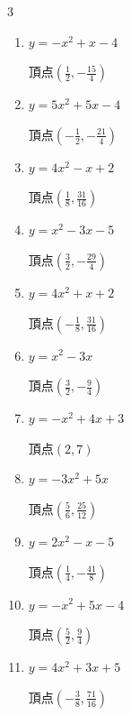 \begin{multicols}{3}
\begin{enumerate}
\resetques

  \item $\displaystyle y=-x^{2}+x-4$

        $\displaystyle 頂点\left( \frac{1}{2} , -\frac{15}{4} \right)$

  \item $\displaystyle y=5x^{2}+5x-4$

        $\displaystyle 頂点\left( -\frac{1}{2} , -\frac{21}{4} \right)$

  \item $\displaystyle y=4x^{2}-x+2$

        $\displaystyle 頂点\left( \frac{1}{8} , \frac{31}{16} \right)$

  \item $\displaystyle y=x^{2}-3x-5$

        $\displaystyle 頂点\left( \frac{3}{2} , -\frac{29}{4} \right)$

  \item $\displaystyle y=4x^{2}+x+2$

        $\displaystyle 頂点\left( -\frac{1}{8} , \frac{31}{16} \right)$

\columnbreak %

  \item $\displaystyle y=x^{2}-3x$

        $\displaystyle 頂点\left( \frac{3}{2} , -\frac{9}{4} \right)$

  \item $\displaystyle y=-x^{2}+4x+3$

        $\displaystyle 頂点\left( 2 , 7 \right)$

  \item $\displaystyle y=-3x^{2}+5x$

        $\displaystyle 頂点\left( \frac{5}{6} , \frac{25}{12} \right)$

  \item $\displaystyle y=2x^{2}-x-5$

        $\displaystyle 頂点\left( \frac{1}{4} , -\frac{41}{8} \right)$

  \item $\displaystyle y=-x^{2}+5x-4$

        $\displaystyle 頂点\left( \frac{5}{2} , \frac{9}{4} \right)$

\columnbreak %

  \item $\displaystyle y=4x^{2}+3x+5$

        $\displaystyle 頂点\left( -\frac{3}{8} , \frac{71}{16} \right)$


\end{enumerate}
\end{multicols}
